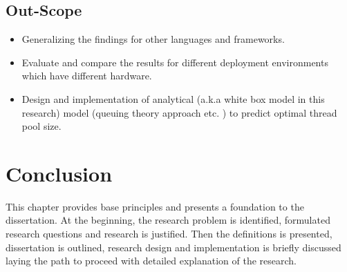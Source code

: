 \subsection{Out-Scope}

\begin{itemize}
	\item Generalizing the findings for other languages and frameworks.
	\item Evaluate and compare the results for different deployment environments which have different hardware.
	\item Design and implementation of analytical (a.k.a white box model in this research) model (queuing theory approach etc. ) to predict optimal thread pool size.
\end{itemize}

\section{Conclusion}	

This chapter provides base principles and presents a foundation to the dissertation. At the beginning, the research problem is identified, formulated research questions and research is justified. Then the definitions is presented, dissertation is outlined, research design and implementation is briefly discussed laying the path to proceed with detailed explanation of the research.